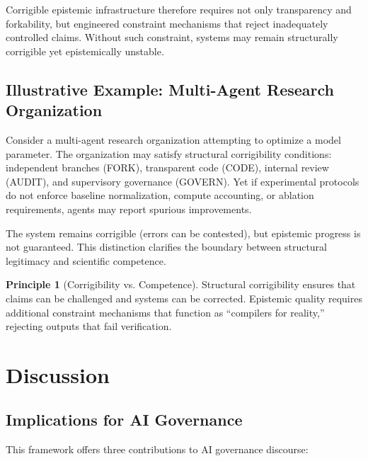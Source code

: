 \documentclass{article}
\theoremstyle{definition}
\newtheorem{principle}{Principle}[section]
\begin{document}
Corrigible epistemic infrastructure therefore requires not only transparency and forkability, but engineered constraint mechanisms that reject inadequately controlled claims. Without such constraint, systems may remain structurally corrigible yet epistemically unstable.

\subsection{Illustrative Example: Multi-Agent Research Organization}

Consider a multi-agent research organization attempting to optimize a model parameter. The organization may satisfy structural corrigibility conditions: independent branches (FORK), transparent code (CODE), internal review (AUDIT), and supervisory governance (GOVERN). Yet if experimental protocols do not enforce baseline normalization, compute accounting, or ablation requirements, agents may report spurious improvements.

The system remains corrigible (errors can be contested), but epistemic progress is not guaranteed. This distinction clarifies the boundary between structural legitimacy and scientific competence.

\begin{principle}[Corrigibility vs. Competence]
Structural corrigibility ensures that claims can be challenged and systems can be corrected. Epistemic quality requires additional constraint mechanisms that function as ``compilers for reality,'' rejecting outputs that fail verification.
\end{principle}


\section{Discussion}
\label{sec:discussion}

\subsection{Implications for AI Governance}

This framework offers three contributions to AI governance discourse:
\end{document}

